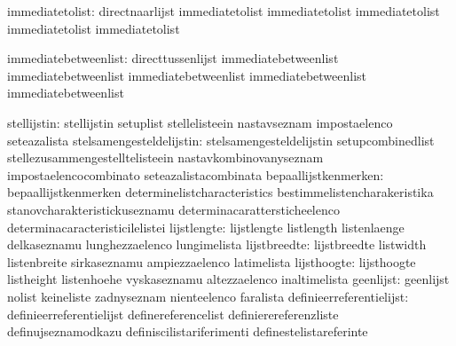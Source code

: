 
                 immediatetolist: directnaarlijst                  immediatetolist
                                  immediatetolist                  immediatetolist
                                  immediatetolist                  immediatetolist

            immediatebetweenlist: directtussenlijst                immediatebetweenlist
                                  immediatebetweenlist             immediatebetweenlist
                                  immediatebetweenlist             immediatebetweenlist

                    stellijstin:  stellijstin                      setuplist
                                  stellelisteein                   nastavseznam
                                  impostaelenco                    seteazalista
       stelsamengesteldelijstin:  stelsamengesteldelijstin         setupcombinedlist
                                  stellezusammengestelltelisteein  nastavkombinovanyseznam
                                  impostaelencocombinato           seteazalistacombinata
           bepaallijstkenmerken:  bepaallijstkenmerken             determinelistcharacteristics
                                  bestimmelistencharakeristika     stanovcharakteristickuseznamu
                                  determinacarattersticheelenco    determinacaracteristicilelistei
                    lijstlengte:  lijstlengte                      listlength
                                  listenlaenge                     delkaseznamu
                                  lunghezzaelenco                  lungimelista
                   lijstbreedte:  lijstbreedte                     listwidth
                                  listenbreite                     sirkaseznamu
                                  ampiezzaelenco                   latimelista
                    lijsthoogte:  lijsthoogte                      listheight
                                  listenhoehe                      vyskaseznamu
                                  altezzaelenco                    inaltimelista
                      geenlijst:  geenlijst                        nolist
                                  keineliste                       zadnyseznam
                                  nienteelenco                     faralista
        definieerreferentielijst: definieerreferentielijst         definereferencelist
                                  definierereferenzliste           definujseznamodkazu
                                  definiscilistariferimenti        definestelistareferinte
